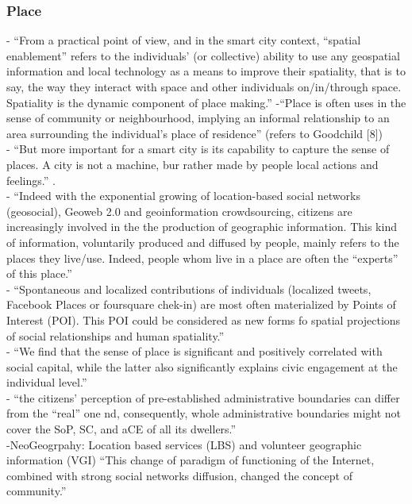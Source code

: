 \subsubsection{Place}
- {\color{orange} “From a practical point of view, and in the smart city context, “spatial enablement” refers to the individuals’ (or collective) ability to use any geospatial information and local technology as a means to improve their spatiality, that is to say, the way they interact with space and other individuals on/in/through space. Spatiality is the dynamic component of place making.”}
-{\color{orange}“Place is often uses in the sense of community or neighbourhood, implying an informal relationship to an area surrounding the individual’s place of residence” (refers to Goodchild [8])} \cite{Roche2012}\\
- {\color{orange}“But more important for a smart city is its capability to capture the sense of places. A city is not a machine, bur rather made by people local actions and feelings.” \cite{Oliveira2021}}.\\
- {\color{orange}  “Indeed with the exponential growing of location-based social networks (geosocial), Geoweb 2.0 and geoinformation crowdsourcing, citizens are increasingly involved in the the production of geographic information. This kind of information, voluntarily produced and diffused by people, mainly refers to the places they live/use. Indeed, people whom live in a place are often the “experts” of this place.”} \cite{Roche2012}\\
- {\color{orange} “Spontaneous and localized contributions of individuals (localized tweets, Facebook Places or foursquare chek-in) are most often materialized by Points of Interest (POI). This POI could be considered as new forms fo spatial projections of social relationships and human spatiality.”} \cite{Roche2012}\\
- {\color{orange} “We find that the sense of place is significant and positively correlated with social capital, while the latter also significantly explains civic engagement at the individual level.”} \cite{Acedo2019}\\
-{\color{orange} “the citizens’ perception of pre-established administrative boundaries can differ from the “real” one nd, consequently, whole administrative boundaries might not cover the SoP, SC, and aCE of all its dwellers.”} \cite{Acedo2019}\\
-{\color{orange}NeoGeogrpahy: Location based services (LBS) and volunteer geographic information (VGI) “This change of paradigm of functioning of the Internet, combined with strong social networks diffusion, changed the concept of community.”} \cite{Painho2013}\\

